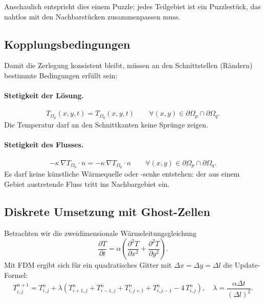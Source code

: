 Anschaulich entspricht dies einem Puzzle: 
jedes Teilgebiet ist ein Puzzlestück, das nahtlos mit den Nachbarstücken zusammenpassen muss.

\subsection{Kopplungsbedingungen}
Damit die Zerlegung konsistent bleibt, müssen an den Schnittstellen (Rändern) bestimmte Bedingungen erfüllt sein:

\paragraph{Stetigkeit der Lösung.}
\begin{equation}
	T_{\Omega_p}(x,y,t) = T_{\Omega_q}(x,y,t)
	\qquad \forall (x,y) \in \partial \Omega_p \cap \partial \Omega_q.
\end{equation}
Die Temperatur darf an den Schnittkanten keine Sprünge zeigen.

\paragraph{Stetigkeit des Flusses.}
\begin{equation}
	- \kappa \, \nabla T_{\Omega_p} \cdot n
	=
	- \kappa \, \nabla T_{\Omega_q} \cdot n
	\qquad \forall (x,y) \in \partial \Omega_p \cap \partial \Omega_q.
\end{equation}
Es darf keine künstliche Wärmequelle oder -senke entstehen: der aus einem Gebiet austretende Fluss tritt ins Nachbargebiet ein.

\subsection{Diskrete Umsetzung mit Ghost-Zellen}
Betrachten wir die zweidimensionale Wärmeleitungsgleichung
\begin{equation}
	\frac{\partial T}{\partial t} = 
	\alpha \left(
	\frac{\partial^2 T}{\partial x^2} + \frac{\partial^2 T}{\partial y^2}
	\right).
\end{equation}
Mit FDM ergibt sich für ein quadratisches Gitter mit $\Delta x=\Delta y=\Delta l$ die Update-Formel:
\begin{equation}
	T_{i,j}^{n+1}
	=
	T_{i,j}^{n}
	+
	\lambda \left(
	T_{i+1,j}^{n}+T_{i-1,j}^{n}+T_{i,j+1}^{n}+T_{i,j-1}^{n}-4\,T_{i,j}^{n}
	\right),
	\quad
	\lambda=\frac{\alpha\Delta t}{(\Delta l)^2}.
	\label{eq:update-dd}
\end{equation}

